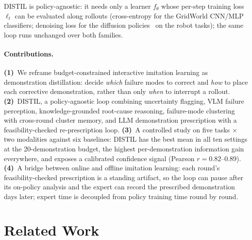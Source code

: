 \documentclass[letterpaper]{article} %
\begin{document}
DISTIL is policy-agnostic: it needs only a learner $f_\theta$ whose
per-step training loss $\ell_t$ can be evaluated along rollouts
(cross-entropy for the GridWorld CNN/MLP classifiers; denoising loss for
the diffusion policies~\citep{chi2023diffusionpolicy} on the robot tasks);
the same loop runs unchanged over both families.

\paragraph{Contributions.}
\textbf{(1)}~We reframe budget-constrained interactive imitation learning as
demonstration distillation: decide \emph{which} failure modes to correct and
\emph{how} to place each corrective demonstration, rather than only
\emph{when} to interrupt a rollout.
\textbf{(2)}~DISTIL, a policy-agnostic loop combining uncertainty flagging,
VLM failure perception, knowledge-grounded root-cause reasoning,
failure-mode clustering with cross-round cluster memory, and LLM
demonstration prescription with a feasibility-checked re-prescription loop.
\textbf{(3)}~A controlled study on five tasks $\times$ two modalities against
six baselines: DISTIL has the best mean in all ten settings at the
20-demonstration budget, the highest per-demonstration information gain everywhere,
and exposes a calibrated confidence signal (Pearson $r=0.82$--$0.89$).
\textbf{(4)}~A bridge between online and offline imitation learning:
each round's feasibility-checked prescription is a standing artifact, so the
loop can pause after its on-policy analysis and the expert can record the
prescribed demonstration days later; expert time is decoupled from policy
training time round by round.

\section{Related Work}
\label{sec:related}
\end{document}

